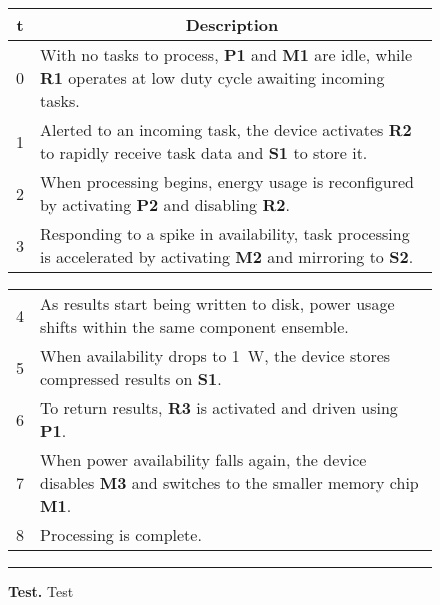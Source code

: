 \begin{figure*}
\noindent\begin{minipage}[t]{0.5\textwidth}
\vspace{0pt}
{\small
\begin{tabularx}{\columnwidth}{cX}

\textbf{t} &
\multicolumn{1}{c}{\textbf{Description}}
\\ \toprule 

0 & With no tasks to process, \textbf{P1} and \textbf{M1} are idle, while
\textbf{R1} operates at low duty cycle awaiting incoming tasks.
\\

1 & 
Alerted to an incoming task, the device activates \textbf{R2} to rapidly
receive task data and \textbf{S1} to store it.
\\

2 &
When processing begins, energy usage is reconfigured by activating
\textbf{P2} and disabling \textbf{R2}.
\\

3 &
Responding to a spike in availability, task processing is accelerated by
activating \textbf{M2} and mirroring to \textbf{S2}.
\\

\end{tabularx}
}
\end{minipage}
\begin{minipage}[t]{0.5\textwidth}
\vspace{0pt}
{\small
\begin{tabularx}{\columnwidth}{cX}

& \\ \toprule 

4 &
As results start being written to disk, power usage shifts within the same
component ensemble.
\\

5 & 
When availability drops to 1~W, the device stores compressed results on
\textbf{S1}.
\\

6 &
To return results, \textbf{R3} is activated and driven using \textbf{P1}.
\\

7 &
When power availability falls again, the device disables \textbf{M3} and
switches to the smaller memory chip \textbf{M1}.
\\

8 &
Processing is complete.
\\

\end{tabularx}
}
\end{minipage}
\caption{\small \textbf{Test.} Test}
\label{table-transitions}
\vspace{0.10in}
\hrule
\vspace{-0.20in}
\end{figure*}
